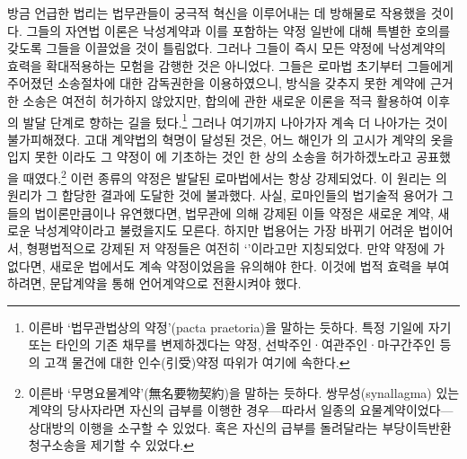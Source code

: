 방금 언급한 법리는 법무관들이 궁극적 혁신을 이루어내는 데
방해물로 작용했을 것이다.
그들의 자연법 이론은
낙성계약과 이를 포함하는 약정 일반에 대해
특별한 호의를 갖도록 그들을 이끌었을 것이 틀림없다.
그러나 그들이 즉시
모든 약정에 낙성계약의 효력을 확대적용하는 모험을 감행한 것은 아니었다.
그들은 로마법 초기부터 그들에게 주어졌던
소송절차에 대한 감독권한을 이용하였으니,
방식을 갖추지 못한 계약에 근거한 소송은 여전히 허가하지 않았지만,
합의에 관한 새로운 이론을 적극 활용하여
이후의 발달 단계로 향하는 길을 텄다.\footnote{%
  이른바 `법무관법상의 약정'(pacta praetoria)을 말하는 듯하다.
  특정 기일에 자기 또는 타인의 기존 채무를 변제하겠다는 약정,
  선박주인^^b7여관주인^^b7마구간주인 등의 고객 물건에 대한 인수(引受)약정
  따위가 여기에 속한다.
  }
그러나
여기까지 나아가자
계속 더 나아가는 것이 불가피해졌다.
고대 계약법의 혁명이 달성된 것은,
어느 해인가 의 고시가
계약의 옷을 입지 못한 이라도
그 약정이 에
기초하는 것인 한
상의 소송을 허가하겠노라고 공표했을 때였다.\footnote{%
  이른바 `무명요물계약'(無名要物契約)을 말하는 듯하다.
  쌍무성(synallagma) 있는 계약의 당사자라면
  자신의 급부를 이행한 경우---따라서 일종의 요물계약이었다---상대방의
  이행을 소구할 수 있었다.
  혹은 자신의 급부를 돌려달라는 부당이득반환청구소송을 제기할 수 있었다.
  }
이런 종류의 약정은 발달된 로마법에서는 항상 강제되었다.
이 원리는
의 원리가 그 합당한 결과에 도달한 것에 불과했다.
사실, 로마인들의 법기술적 용어가 그들의 법이론만큼이나 유연했다면,
법무관에 의해 강제된 이들 약정은
새로운 계약, 새로운 낙성계약이라고 불렸을지도 모른다.
하지만 법용어는 가장 바뀌기 어려운 법이어서,
형평법적으로 강제된 저 약정들은
여전히 `'이라고만 지칭되었다.
만약 약정에 가 없다면,
%
새로운 법에서도 계속 약정이었음을
유의해야 한다.
이것에 법적 효력을 부여하려면,
문답계약을 통해 언어계약으로 전환시켜야 했다.

